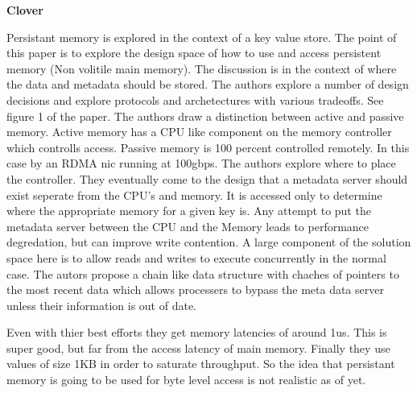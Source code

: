 

\textbf{Clover~\cite{clover}}

Persistant memory is explored in the context of a key value store. The point
of this paper is to explore the design space of how to use and access
persistent memory (Non volitile main memory). The discussion is in the
context of where the data and metadata should be stored. The authors explore
a number of design decisions and explore protocols and archetectures with
various tradeoffs. See figure 1 of the paper. The authors draw a distinction
between active and passive memory. Active memory has a CPU like component on
the memory controller which controlls access. Passive memory is 100 percent
controlled remotely. In this case by an RDMA nic running at 100gbps. The
authors explore where to place the controller. They eventually come to the
design that a metadata server should exist seperate from the CPU's and
memory. It is accessed only to determine where the appropriate memory for a
given key is. Any attempt to put the metadata server between the CPU and the
Memory leads to performance degredation, but can improve write contention. A
large component of the solution space here is to allow reads and writes to
execute concurrently in the normal case. The autors propose a chain like data
structure with chaches of pointers to the most recent data which allows
processers to bypass the meta data server unless their information is out of
date. 

Even with thier best efforts they get memory latencies of around 1us. This is
super good, but far from the access latency of main memory. Finally they use
values of size 1KB in order to saturate throughput. So the idea that
persistant memory is going to be used for byte level access is not realistic
as of yet.

